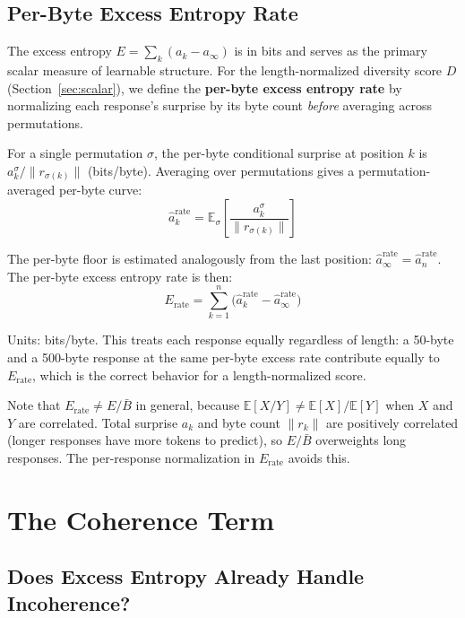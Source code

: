 \documentclass[11pt]{article}
\newcommand{\E}{\mathbb{E}}
\begin{document}
\subsection{Per-Byte Excess Entropy Rate}\label{sec:per-byte-rate}

The excess entropy $E = \sum_k (a_k - a_\infty)$ is in bits and serves as the primary scalar measure of learnable structure. For the length-normalized diversity score $D$ (Section~\ref{sec:scalar}), we define the \textbf{per-byte excess entropy rate} by normalizing each response's surprise by its byte count \emph{before} averaging across permutations.

For a single permutation $\sigma$, the per-byte conditional surprise at position $k$ is $a_k^\sigma / \|r_{\sigma(k)}\|$ (bits/byte). Averaging over permutations gives a permutation-averaged per-byte curve:
\begin{equation}
    \hat{a}_k^{\mathrm{rate}} = \E_\sigma\!\left[\frac{a_k^\sigma}{\|r_{\sigma(k)}\|}\right]
\end{equation}

The per-byte floor is estimated analogously from the last position: $\hat{a}_\infty^{\mathrm{rate}} = \hat{a}_n^{\mathrm{rate}}$. The per-byte excess entropy rate is then:
\begin{equation}\label{eq:per-byte-E}
    E_{\mathrm{rate}} = \sum_{k=1}^{n}\bigl(\hat{a}_k^{\mathrm{rate}} - \hat{a}_\infty^{\mathrm{rate}}\bigr)
\end{equation}

Units: bits/byte. This treats each response equally regardless of length: a 50-byte and a 500-byte response at the same per-byte excess rate contribute equally to $E_{\mathrm{rate}}$, which is the correct behavior for a length-normalized score.

Note that $E_{\mathrm{rate}} \neq E / \bar{B}$ in general, because $\E[X/Y] \neq \E[X]/\E[Y]$ when $X$ and $Y$ are correlated. Total surprise $a_k$ and byte count $\|r_k\|$ are positively correlated (longer responses have more tokens to predict), so $E / \bar{B}$ overweights long responses. The per-response normalization in $E_{\mathrm{rate}}$ avoids this.

\section{The Coherence Term}\label{sec:coherence}

\subsection{Does Excess Entropy Already Handle Incoherence?}
\end{document}

